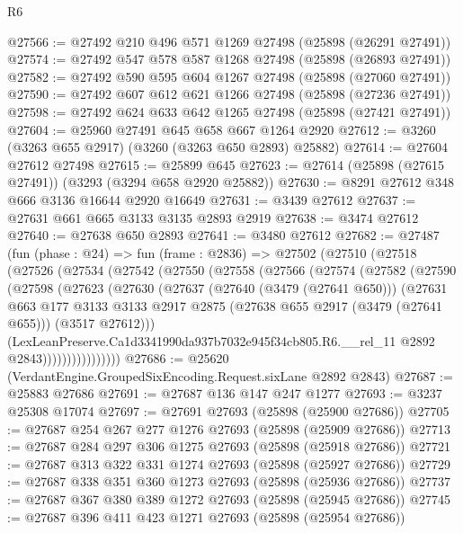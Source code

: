 \begin{lexlean}{R6}
\begin{coremodule}
@27566 := @27492 @210 @496 @571 @1269 @27498 (@25898 (@26291 @27491))
@27574 := @27492 @547 @578 @587 @1268 @27498 (@25898 (@26893 @27491))
@27582 := @27492 @590 @595 @604 @1267 @27498 (@25898 (@27060 @27491))
@27590 := @27492 @607 @612 @621 @1266 @27498 (@25898 (@27236 @27491))
@27598 := @27492 @624 @633 @642 @1265 @27498 (@25898 (@27421 @27491))
@27604 := @25960 @27491 @645 @658 @667 @1264 @2920
@27612 := @3260 (@3263 @655 @2917) (@3260 (@3263 @650 @2893) @25882)
@27614 := @27604 @27612 @27498
@27615 := @25899 @645
@27623 := @27614 (@25898 (@27615 @27491)) (@3293 (@3294 @658 @2920 @25882))
@27630 := @8291 @27612 @348 @666 @3136 @16644 @2920 @16649
@27631 := @3439 @27612
@27637 := @27631 @661 @665 @3133 @3135 @2893 @2919
@27638 := @3474 @27612
@27640 := @27638 @650 @2893
@27641 := @3480 @27612
@27682 := @27487
    (fun (phase : @24) =>
    fun (frame : @2836) =>
    @27502
      (@27510
        (@27518
          (@27526
            (@27534
              (@27542
                (@27550
                  (@27558
                    (@27566
                      (@27574
                        (@27582
                          (@27590
                            (@27598
                              (@27623
                                (@27630
                                  (@27637
                                    (@27640 (@3479 (@27641 @650)))
                                    (@27631
                                      @663
                                      @177
                                      @3133
                                      @3133
                                      @2917
                                      @2875
                                      (@27638 @655 @2917 (@3479 (@27641 @655)))
                                      (@3517 @27612)))
                                  (LexLeanPreserve.Ca1d3341990da937b7032e945f34cb805.R6.__rel_11
                                    @2892
                                    @2843))))))))))))))))
@27686 := @25620 (VerdantEngine.GroupedSixEncoding.Request.sixLane @2892 @2843)
@27687 := @25883 @27686
@27691 := @27687 @136 @147 @247 @1277
@27693 := @3237 @25308 @17074
@27697 := @27691 @27693 (@25898 (@25900 @27686))
@27705 := @27687 @254 @267 @277 @1276 @27693 (@25898 (@25909 @27686))
@27713 := @27687 @284 @297 @306 @1275 @27693 (@25898 (@25918 @27686))
@27721 := @27687 @313 @322 @331 @1274 @27693 (@25898 (@25927 @27686))
@27729 := @27687 @338 @351 @360 @1273 @27693 (@25898 (@25936 @27686))
@27737 := @27687 @367 @380 @389 @1272 @27693 (@25898 (@25945 @27686))
@27745 := @27687 @396 @411 @423 @1271 @27693 (@25898 (@25954 @27686))

\end{coremodule}
\end{lexlean}
